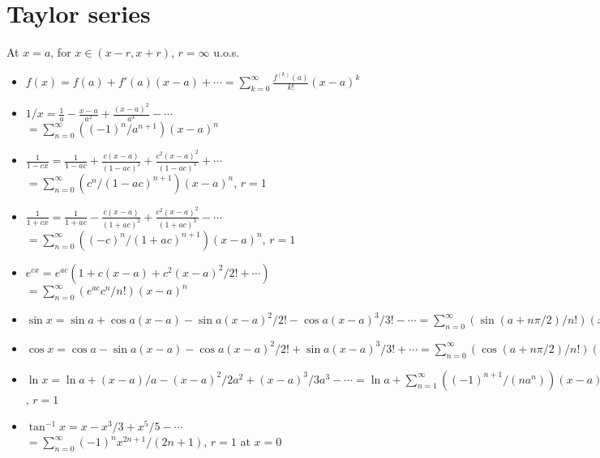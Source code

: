 \documentclass{slnotes}
\begin{document}
\section{Taylor series}
At \(x = a\), for \(x \in (x - r, x + r)\), \(r = \infty\) u.o.s.
\begin{itemize}
\item \(f(x) = f(a) + f'(a)(x-a) + \cdots = \sum^\infty_{k=0}\frac{f^{(k)}(a)}{k!}(x-a)^k\)
\item \(1/x = \frac{1}{a} - \frac{x - a}{a^2} + \frac{(x-a)^2}{a^3} - \cdots\)\\\(= \sum^\infty_{n=0}((-1)^n/a^{n+1})(x-a)^n\)
\item \(\frac{1}{1-cx} = \frac{1}{1-ac} + \frac{c(x-a)}{(1-ac)^2} + \frac{c^2(x-a)^2}{(1-ac)^3} + \cdots\)\\\(= \sum^\infty_{n=0}(c^n/(1-ac)^{n+1})(x-a)^n\), \(r = 1\)
\item \(\frac{1}{1+cx} = \frac{1}{1+ac} - \frac{c(x-a)}{(1+ac)^2} + \frac{c^2(x-a)^2}{(1+ac)^3} - \cdots\)\\\(= \sum^\infty_{n=0}((-c)^n/(1+ac)^{n+1})(x-a)^n\), \(r = 1\)
\item \(e^{cx} = e^{ac}(1 + c(x-a) + c^2(x-a)^2/2! + \cdots)\)\\\(= \sum^\infty_{n=0}(e^{ac}c^n/n!)(x-a)^n\)
\item \(\sin x = \sin a + \cos a(x-a) - \sin a(x-a)^2/2! - \cos a(x-a)^3/3! - \cdots = \sum^\infty_{n=0} (\sin(a+n\pi/2)/n!)(x-a)^n\)
\item \(\cos x = \cos a - \sin a(x-a) - \cos a(x-a)^2/2! + \sin a(x-a)^3/3! + \cdots = \sum^\infty_{n=0} (\cos(a+n\pi/2)/n!)(x-a)^n\)
\item \(\ln x = \ln a + (x-a)/a - (x-a)^2/2a^2 + (x-a)^3/3a^3 - \cdots = \ln a + \sum^\infty_{n=1} ((-1)^{n+1}/(na^n))(x-a)^n\), \(r = 1\)
\item \(\tan^{-1}x = x - x^3/3 + x^5/5 - \cdots\)\\\(= \sum^\infty_{n=0} (-1)^n x^{2n+1} / (2n+1)\), \(r = 1\) at \(x = 0\)
\end{itemize}
\end{document}
